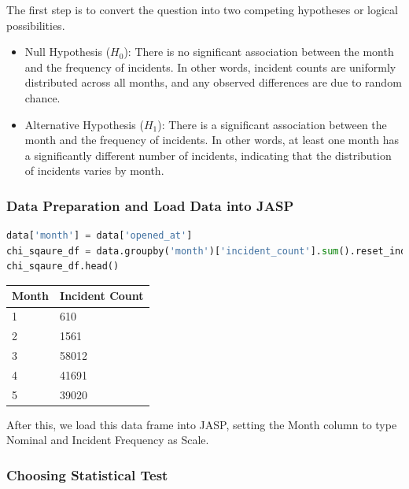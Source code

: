 \documentclass{article}
\begin{document}
The first step is to convert the question into two competing hypotheses or logical possibilities.
\begin{itemize}
    \item Null Hypothesis ($H_0$): There is no significant association between the month and the frequency of incidents. In other words, incident counts are uniformly distributed across all months, and any observed differences are due to random chance.

    \item Alternative Hypothesis ($H_1$): There is a significant association between the month and the frequency of incidents. In other words, at least one month has a significantly different number of incidents, indicating that the distribution of incidents varies by month.
\end{itemize}


\subsubsection{Data Preparation and Load Data into JASP}

\begin{lstlisting}[language=Python]
data['month'] = data['opened_at']
chi_sqaure_df = data.groupby('month')['incident_count'].sum().reset_index()
chi_sqaure_df.head()
\end{lstlisting}

\begin{table}[htbp]
\centering
\begin{flushleft}
\begin{tabular}{|l|l|}
\hline
\textbf{Month} & \textbf{Incident Count} \\
\hline
1 & 610 \\
2 & 1561 \\
3 & 58012 \\
4 & 41691 \\
5 & 39020 \\
\hline
\end{tabular}
\end{flushleft}
\label{tab:incident_count}
\end{table}

After this, we load this data frame into JASP, setting the Month column to type Nominal and Incident Frequency as Scale.

\subsubsection{Choosing Statistical Test}
\end{document}
